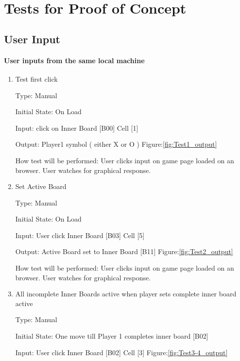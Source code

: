 \documentclass[12pt, titlepage]{article}
\begin{document}
\section{Tests for Proof of Concept} \label{POC}

\subsection{User Input}
		
\paragraph{User inputs from the same local machine}

\begin{enumerate}

\item{Test first click\\}

Type: Manual
					
Initial State: On Load
					
Input: click on Inner Board [B00] Cell [1] 
					
Output: Player1 symbol ( either X or O ) Figure:\ref{fig:Test1_output}
					
How test will be performed: User clicks input on game page loaded on an
browser. User watches for graphical response.

\item{Set Active Board\\}

Type: Manual
					
Initial State: On Load
					
Input: User click Inner Board [B03] Cell [5] 
					
Output:  Active Board set to Inner Board [B11] Figure:\ref{fig:Test2_output}
					
How test will be performed: User clicks input on game page loaded on an
browser. User watches for graphical response.


\item{All incomplete Inner Boards active when player sets complete inner board active \\}

Type: Manual
					
Initial State: One move till Player 1 completes inner board [B02]
					
Input: User click Inner Board [B02] Cell [3] Figure:\ref{fig:Test3-4_output}
					

\end{enumerate}
\end{document}
